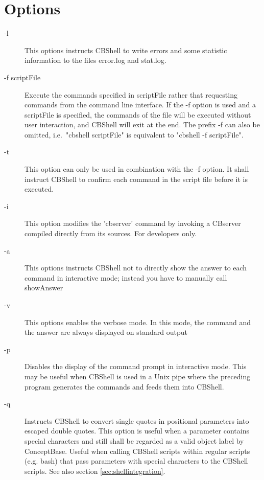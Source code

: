 \section{Options} 


\begin{description}

\item[-l] This options instructs CBShell to write errors and some statistic information
to the files error.log and stat.log.

\item[-f scriptFile] Execute the commands specified in scriptFile rather that requesting commands
from the command line interface. If the -f option is used and a scriptFile
is specified, the commands of the file will be executed without user interaction,
and CBShell will exit at the end. The prefix -f can also be omitted, i.e.\
"cbshell scriptFile" is equivalent to "cbshell -f scriptFile".

\item[-t] This option can only be used in combination with the -f option. It shall instruct CBShell
to confirm each command in the script file before it is executed.

\item[-i] This option modifies the 'cbserver' command by invoking a CBserver compiled directly from its sources.
For developers only.

\item[-a] This options instructs CBShell not to directly show the answer to
   each command in interactive mode;  instead you have to manually call showAnswer

\item[-v] This options enables the verbose mode. In this mode, the command and the answer
   are always displayed on standard output

\item[-p] Disables the display of the command prompt in interactive mode. This may be
useful when CBShell is used in a Unix pipe where the preceding program generates the
commands and feeds them into CBShell.

\item[-q] Instructs CBShell to convert single quotes in positional parameters into escaped double quotes.
This option is useful when a parameter contains special characters and still shall be regarded as a valid
object label by ConceptBase. Useful when calling CBShell scripts within regular scripts (e.g. bash)
that pass parameters with special characters to the CBShell scripts.
See also section \ref{sec:shellintegration}.


\end{description}
